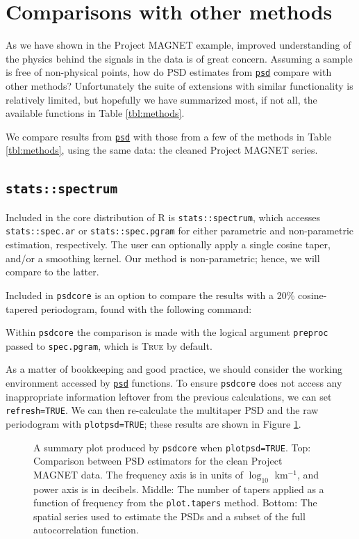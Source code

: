 \documentclass[10pt]{article}\usepackage[]{graphicx}\usepackage[]{color}
\newcommand{\SC}[1]{\textsc{#1}}
\newcommand{\Rcmd}[1]{\texttt{#1}}
\newcommand{\psd}[0]{\href{http://www.github.com/abarbour/psd/}{\color{blue}\Rcmd{psd}}}
\begin{document}
\clearpage

\section{Comparisons with other methods}

As we have shown in the Project MAGNET example, 
improved understanding of the physics behind the signals in the data
is of great concern.
Assuming a sample is free of non-physical points, how do
PSD estimates from \psd{}
compare with other methods?
Unfortunately the suite of extensions with similar functionality
is relatively limited, but hopefully we have
summarized most, if not all, the available functions in Table \ref{tbl:methods}.



We compare results from
\psd{} with those from a few of the methods in Table \ref{tbl:methods},
using the same data: the cleaned Project MAGNET series.

\subsection{\Rcmd{stats::spectrum}}

Included in the core distribution of R is \Rcmd{stats::spectrum}, which
accesses \Rcmd{stats::spec.ar} or \Rcmd{stats::spec.pgram} for either
parametric and non-parametric estimation, respectively.  
The user can optionally apply a single cosine taper, and/or a smoothing kernel.
Our method is non-parametric; hence, we will compare to the latter.

Included in \Rcmd{psdcore} is an option to compare the 
results with a 20\% cosine-tapered periodogram,
found with the following command:

Within \Rcmd{psdcore} the comparison is
made with
the logical argument \Rcmd{preproc} 
passed to \Rcmd{spec.pgram}, which is \SC{True} by default.

As a matter of bookkeeping and good practice, 
we should consider the working environment
accessed by \psd{} functions.
To ensure
\Rcmd{psdcore} does not access any inappropriate information leftover
from the previous calculations, we
can set \Rcmd{refresh=TRUE}.
We can then
re-calculate the multitaper PSD and the
raw periodogram with \Rcmd{plotpsd=TRUE}; these
results are shown in Figure \ref{fig:two}.

\begin{figure}[!htbp]
\begin{center}

\caption{A summary plot produced by \Rcmd{psdcore} when
\Rcmd{plotpsd=TRUE}.  
Top: Comparison between PSD estimators for the 
clean Project MAGNET data. The frequency axis is in units of $\log_{10}$ km$^{-1}$,
and power axis is in decibels.
Middle: The number of tapers applied as a function of frequency from
the \Rcmd{plot.tapers} method. 
Bottom: The spatial series used to estimate the PSDs and a subset
of the full autocorrelation function.}
\label{fig:two}
\end{center}
\end{figure}
\end{document}
